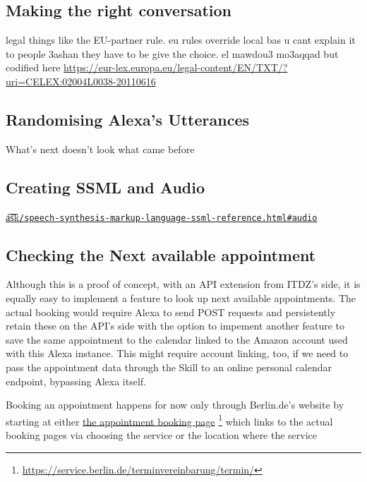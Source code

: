\subsection*{Making the right conversation}



legal things like the EU-partner rule.
eu rules override local
bas u cant explain it to people 3ashan they have to be give the choice.
el mawdou3 mo3aqqad but codified here
\url{https://eur-lex.europa.eu/legal-content/EN/TXT/?uri=CELEX:02004L0038-20110616}





\subsection*{Randomising Alexa's Utterances}
What’s next doesn’t look what came before



\subsection*{Creating SSML and Audio}


\href{https://developer.amazon.com/docs/custom-skills/speech-synthesis-markup-language-ssml-reference.html#audio}{\t{a\t{sk}}\lstinline|/speech-synthesis-markup-language-ssml-reference.html#audio|}



\subsection*{Checking the Next available appointment}

Although this is a proof of concept, with an API extension from ITDZ's side, it is equally easy to implement a feature to look up next available appointments.
The actual booking would require Alexa to send POST requests and persistently retain these on the API's side with the option to impement another feature to save the same appointment to the calendar linked to the Amazon account used with this Alexa instance. This might require account linking, too, if we need to pass the appointment data through the Skill to an online personal calendar endpoint, bypassing Alexa itself.

Booking an appointment happens for now only through Berlin.de's website by starting at either \href{https://service.berlin.de/terminvereinbarung/termin/}{the appointment booking page} \footnote{\url{https://service.berlin.de/terminvereinbarung/termin/}} which links to the actual booking pages via choosing the service or the location where the service 



